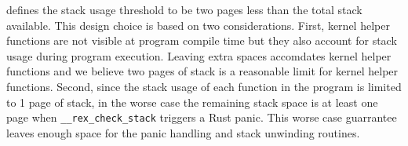 \projname{} defines the stack usage threshold to be two pages less than the
    total stack available.
This design choice is based on two considerations.
First, kernel helper functions are not visible at program compile time but they
    also account for stack usage during program execution.
Leaving extra spaces accomdates kernel helper functions and we believe two
    pages of stack is a reasonable limit for kernel helper functions.
Second, since the stack usage of each function in the program is limited to
    1 page of stack, in the worse case the remaining stack space is at least
    one page when \texttt{\_\_rex\_check\_stack} triggers a Rust panic.
This worse case guarrantee leaves enough space for the panic handling and stack
    unwinding routines.